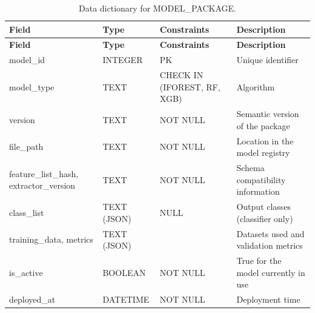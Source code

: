 {\small
\begin{longtable}{|>{\raggedright\arraybackslash}p{}|>{\raggedright\arraybackslash}p{}|>{\raggedright\arraybackslash}p{}|>{\raggedright\arraybackslash}p{}|}
\caption{Data dictionary for MODEL\_PACKAGE.}\label{tab:4.24}\\
\hline
\textbf{Field} & \textbf{Type} & \textbf{Constraints} & \textbf{Description} \\ \hline
\endfirsthead
\hline
\textbf{Field} & \textbf{Type} & \textbf{Constraints} & \textbf{Description} \\ \hline
\endhead
model\_id & INTEGER & PK & Unique identifier \\ \hline
model\_type & TEXT & CHECK IN (IFOREST, RF, XGB) & Algorithm \\ \hline
version & TEXT & NOT NULL & Semantic version of the package \\ \hline
file\_path & TEXT & NOT NULL & Location in the model registry \\ \hline
feature\_list\_hash, extractor\_version & TEXT & NOT NULL & Schema compatibility information \\ \hline
class\_list & TEXT (JSON) & NULL & Output classes (classifier only) \\ \hline
training\_data, metrics & TEXT (JSON) &  & Datasets used and validation metrics \\ \hline
is\_active & BOOLEAN & NOT NULL & True for the model currently in use \\ \hline
deployed\_at & DATETIME & NOT NULL & Deployment time \\ \hline
\end{longtable}
}

